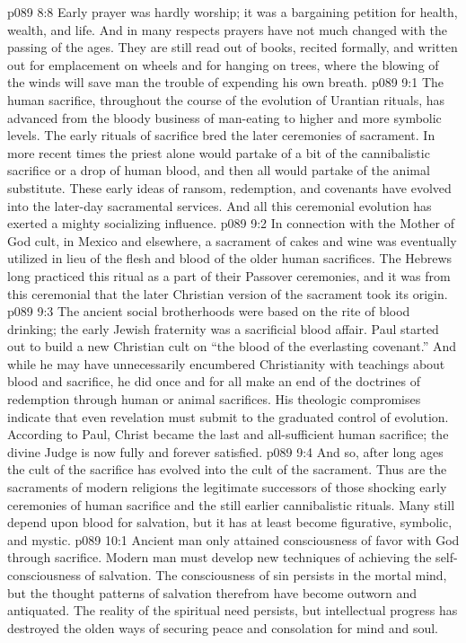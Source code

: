 \vs p089 8:8 Early prayer was hardly worship; it was a bargaining petition for health, wealth, and life. And in many respects prayers have not much changed with the passing of the ages. They are still read out of books, recited formally, and written out for emplacement on wheels and for hanging on trees, where the blowing of the winds will save man the trouble of expending his own breath.\plusone
{}
\vs p089 9:1 The human sacrifice, throughout the course of the evolution of Urantian rituals, has advanced from the bloody business of man\hyp{}eating to higher and more symbolic levels. The early rituals of sacrifice bred the later ceremonies of sacrament. In more recent times the priest alone would partake of a bit of the cannibalistic sacrifice or a drop of human blood, and then all would partake of the animal substitute. These early ideas of ransom, redemption, and covenants have evolved into the later\hyp{}day sacramental services. And all this ceremonial evolution has exerted a mighty socializing influence.
\vs p089 9:2 In connection with the Mother of God cult, in Mexico and elsewhere, a sacrament of cakes and wine was eventually utilized in lieu of the flesh and blood of the older human sacrifices. The Hebrews long practiced this ritual as a part of their Passover ceremonies, and it was from this ceremonial that the later Christian version of the sacrament took its origin.
\vs p089 9:3 The ancient social brotherhoods were based on the rite of blood drinking; the early Jewish fraternity was a sacrificial blood affair. Paul started out to build a new Christian cult on “the blood of the everlasting covenant.” And while he may have unnecessarily encumbered Christianity with teachings about blood and sacrifice, he did once and for all make an end of the doctrines of redemption through human or animal sacrifices. His theologic compromises indicate that even revelation must submit to the graduated control of evolution. According to Paul, Christ became the last and all\hyp{}sufficient human sacrifice; the divine Judge is now fully and forever satisfied.
\vs p089 9:4 And so, after long ages the cult of the sacrifice has evolved into the cult of the sacrament. Thus are the sacraments of modern religions the legitimate successors of those shocking early ceremonies of human sacrifice and the still earlier cannibalistic rituals. Many still depend upon blood for salvation, but it has at least become figurative, symbolic, and mystic.
\vs p089 10:1 Ancient man only attained consciousness of favor with God through sacrifice. Modern man must develop new techniques of achieving the self\hyp{}consciousness of salvation. The consciousness of sin persists in the mortal mind, but the thought patterns of salvation therefrom have become outworn and antiquated. The reality of the spiritual need persists, but intellectual progress has destroyed the olden ways of securing peace and consolation for mind and soul.
